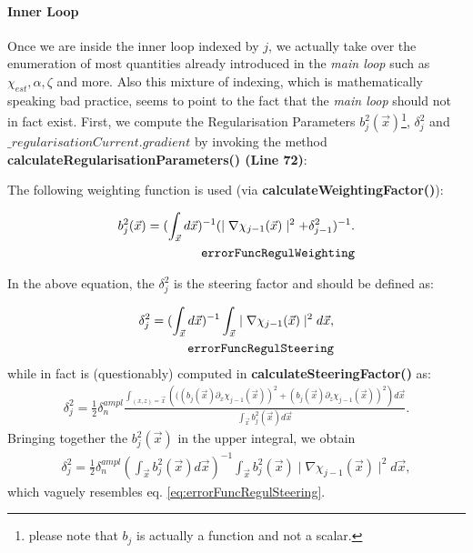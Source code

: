 \documentclass[10pt,a4paper]{article}
\begin{document}
{
\paragraph{Inner Loop}
Once we are inside the inner loop indexed by $j$, we actually take over the enumeration of most quantities already introduced in the \textit{main loop} such as $\chi_{est}, \alpha, \zeta$ and more. Also this mixture of indexing, which is mathematically speaking bad practice, seems to point to the fact that the \textit{main loop} should not in fact exist.
\newline
First, we compute the Regularisation Parameters $b^2_j(\vec{x})$\footnote{please note that $b_j$ is actually a function and not a scalar.}, $\delta^2_j$  and $\_regularisationCurrent.gradient$ by invoking the method \textbf{calculateRegularisationParameters() (Line 72)}:
}

The following weighting function is used {(via \textbf{calculateWeightingFactor()})}:

\begin{align} \label{eq:errorFuncRegulWeighting} b_j^{2}(\vec{x}) = (\int_{\vec{x}}
d\vec{x})^{-1} (\mid\nabla\chi_{j-1}(\vec{x})\mid^2 + \delta_{j-1}^2)^{-1}.\\
\tag*{\texttt{errorFuncRegulWeighting}}
\end{align}

In the above equation, the $\delta_{j}^2$ is the steering factor and
{should} be defined as:

\begin{align} \label{eq:errorFuncRegulSteering} \delta_{j}^2 = (\int_{\vec{x}}
d\vec{x})^{-1} \int_{\vec{x}} \mid\nabla\chi_{j-1}(\vec{x})\mid^2 d\vec{x},\\
\tag*{\texttt{errorFuncRegulSteering}}
\end{align}
{while in fact is (questionably) computed in \textbf{calculateSteeringFactor()} as:
\begin{align}  \delta_j^2 = \frac{1}{2} \delta^{ampl}_n \frac{\int_{(x,z) = \vec{x}}\left(((b_j(\vec{x}) \partial_x \chi_{j-1}(\vec{x}))^2  + (b_j(\vec{x}) \partial_z \chi_{j-1}(\vec{x}))^2\right) d \vec{x}}{\int_{\vec{x}}b_j^2(\vec{x}) d \vec{x}}.
\end{align}
Bringing together the $b_j^2(\vec{x})$ in the upper integral, we obtain
\begin{align} \label{eq:errorFuncRegulSteeringWrong}
\delta_{j}^2 = \frac{1}{2} \delta^{ampl}_n \left(\int_{\vec{x}}
b_j^2(\vec{x})d\vec{x}\right)^{-1} \int_{\vec{x}} b_j^2(\vec{x}) \mid\nabla\chi_{j-1}(\vec{x})\mid^2 d\vec{x},
\end{align}
which vaguely resembles eq. \eqref{eq:errorFuncRegulSteering}.
}
\newline
\end{document}
